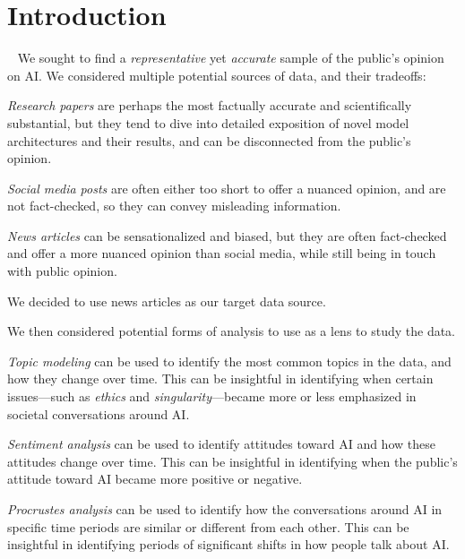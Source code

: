 \section{Introduction}~\label{sec:introduction}
We sought to find a \emph{representative} yet \emph{accurate} sample of the public's opinion on AI.
We considered multiple potential sources of data, and their tradeoffs:
\begin{enumroman}
  \item \emph{Research papers} are perhaps the most factually accurate
    and scientifically substantial, but they
    tend to dive into detailed exposition of novel
    model architectures and their results, and can be disconnected
    from the public's opinion.
  \item \emph{Social media posts} are often either too short to offer a nuanced
    opinion, and are not fact-checked, so they can convey misleading information.
  \item \emph{News articles} can be sensationalized and biased, but they
    are often fact-checked and offer a more nuanced opinion than social media,
    while still being in touch with public opinion. 
\end{enumroman}

We decided to use news articles as our target data source.

We then considered potential forms of analysis to use as a lens to study the data.
\begin{enumroman}
  \item \emph{Topic modeling} can be used to identify the most common topics
    in the data, and how they change over time. This can be insightful in
    identifying when certain issues---such as \emph{ethics}
    and \emph{singularity}---became more or less emphasized
    in societal conversations around AI.
  \item \emph{Sentiment analysis} can be used to identify attitudes
    toward AI and how these attitudes change over time.
    This can be insightful in identifying when the public's attitude toward AI became more positive
    or negative.
  \item \emph{Procrustes analysis} can be used to identify how the conversations
    around AI in specific time periods are similar or different from each other.
    This can be insightful in identifying periods of significant shifts
    in how people talk about AI.
\end{enumroman}
